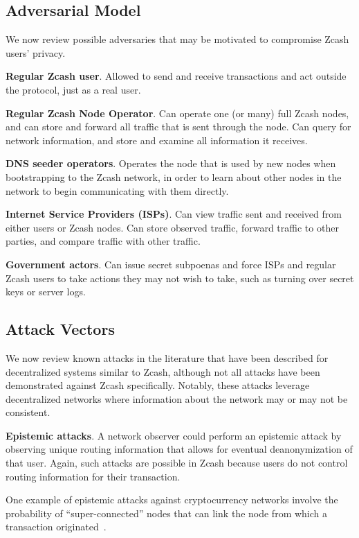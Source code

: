 \documentclass{article}
\begin{document}
\subsection{Adversarial Model}

We now review possible adversaries that may be motivated to compromise Zcash users'
privacy.

\textbf{Regular Zcash user}. Allowed to send and receive transactions and act
outside the protocol, just as a real user.

\textbf{Regular Zcash Node Operator}. Can operate one (or many) full Zcash
nodes, and can store and forward all traffic that is sent through the node. Can
query for network information, and store and examine all information it
receives.

\textbf{DNS seeder operators}. Operates the node that is used by new nodes when
bootstrapping to the Zcash network, in order to learn about other nodes in the
network to begin communicating with them directly.

\textbf{Internet Service Providers (ISPs)}. Can view traffic sent and received
from either users or Zcash nodes. Can store observed traffic, forward traffic
to other parties, and compare traffic with other traffic.

\textbf{Government actors}. Can issue secret subpoenas and force ISPs and
regular Zcash users to take actions they may not wish to take, such as turning
over secret keys or server logs.

\subsection{Attack Vectors}
\label{attack-vectors}

We now review known attacks in the literature that have been described for
decentralized systems similar to Zcash, although not all attacks have been
demonstrated against Zcash specifically. Notably, these attacks leverage
decentralized networks where information about the network may or may not be
consistent.

\textbf{Epistemic attacks}. A network observer could perform an epistemic
attack by observing unique routing information that allows for eventual
deanonymization of that user. Again, such attacks are possible in Zcash because
users do not control routing information for their transaction.

One example of epistemic attacks against cryptocurrency networks involve the
probability of ``super-connected'' nodes that can link the node from which a
transaction originated~\cite{dandelion, fanti2018dandelion}.
\end{document}
